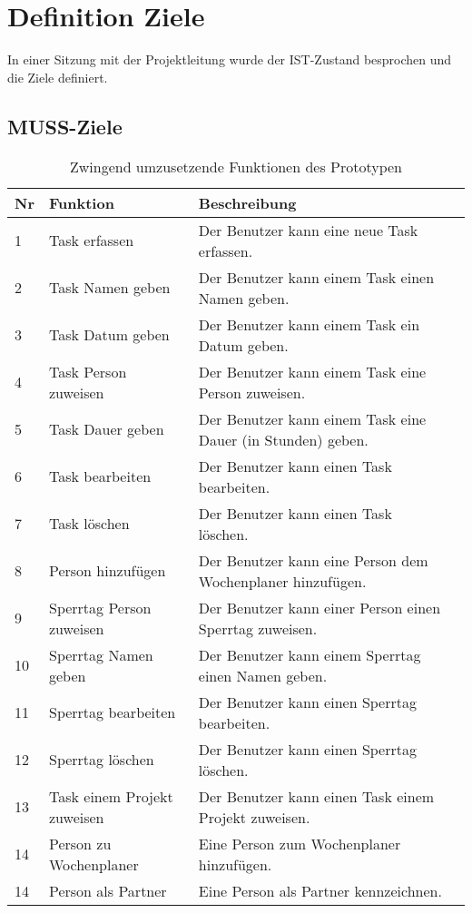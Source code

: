 \section{Definition Ziele}
In einer Sitzung mit der Projektleitung wurde der IST-Zustand besprochen und die Ziele definiert.

\subsection{MUSS-Ziele}
\begin{table}[!ht]
\begin{center}
    \begin{tabular}{llp{8cm}l}
        \toprule Nr & Funktion & Beschreibung \\
        \midrule 1 & Task erfassen & Der Benutzer kann eine neue Task erfassen. \\
        \midrule 2 & Task Namen geben & Der Benutzer kann einem Task einen Namen geben. \\
        \midrule 3 & Task Datum geben & Der Benutzer kann einem Task ein Datum geben. \\
        \midrule 4 & Task Person zuweisen & Der Benutzer kann einem Task eine Person zuweisen. \\
        \midrule 5 & Task Dauer geben & Der Benutzer kann einem Task eine Dauer (in Stunden) geben. \\
        \midrule 6 & Task bearbeiten & Der Benutzer kann einen Task bearbeiten. \\ 
        \midrule 7 & Task löschen & Der Benutzer kann einen Task löschen. \\
        \midrule 8 & Person hinzufügen & Der Benutzer kann eine Person dem Wochenplaner hinzufügen. \\
        \midrule 9 & Sperrtag Person zuweisen & Der Benutzer kann einer Person einen Sperrtag zuweisen. \\
        \midrule 10 & Sperrtag Namen geben & Der Benutzer kann einem Sperrtag einen Namen geben. \\
        \midrule 11 & Sperrtag bearbeiten & Der Benutzer kann einen Sperrtag bearbeiten.\\
        \midrule 12 & Sperrtag löschen & Der Benutzer kann einen Sperrtag löschen.\\
        \midrule 13 & Task einem Projekt zuweisen & Der Benutzer kann einen Task einem Projekt zuweisen.\\
        \midrule 14 & Person zu Wochenplaner & Eine Person zum Wochenplaner hinzufügen.\\
        \midrule 14 & Person als Partner & Eine Person als Partner kennzeichnen.\\
        \bottomrule
    \end{tabular}
    \caption{Zwingend umzusetzende Funktionen des Prototypen}
    \label{tab:muss_funktionen}
\end{center}
\end{table}
